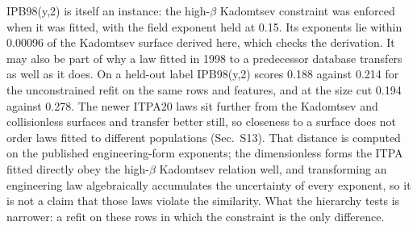 \documentclass[aip,pop,preprint,amsmath,amssymb]{revtex4-2}
\begin{document}
IPB98(y,2) is itself an instance: the high-$\beta$ Kadomtsev constraint was
enforced when it was fitted, with the field exponent held at
0.15\cite{ipb98,hdb5}. Its exponents lie within 0.00096 of the Kadomtsev surface
derived here, which checks the derivation. It may also be part of why a law
fitted in 1998 to a predecessor database transfers as well as it does. On a held-out
label IPB98(y,2) scores 0.188 against 0.214 for the unconstrained refit on the
same rows and features, and at the size cut 0.194 against 0.278. The newer
ITPA20 laws sit further from the Kadomtsev and collisionless surfaces and
transfer better still, so closeness to a surface does not order laws fitted
to different populations (Sec.~S13). That distance is computed on the
published engineering-form exponents; the dimensionless forms the ITPA fitted
directly obey the high-$\beta$ Kadomtsev relation well\cite{yoshida25}, and
transforming an engineering law algebraically accumulates the uncertainty of
every exponent, so it is not a claim that those laws violate the similarity.
What the hierarchy tests is narrower: a refit on these rows in which the
constraint is the only difference.
\end{document}
